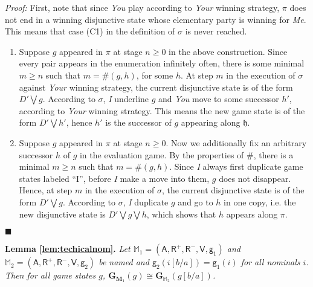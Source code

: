 \documentclass{easychair}
\newcommand{\I}{\emph{I}\xspace}
\newcommand{\You}{\emph{You}\xspace}
\newcommand{\Me}{\emph{Me}\xspace}
\newcommand{\Your}{\emph{Your}\xspace}
\newcommand{\A}{\mathsf{A}}
\newcommand{\R}{\mathsf{R}}
\newcommand{\V}{\mathsf{V}}
\newcommand{\g}{\mathsf{g}}
\renewcommand{\qed}{\hfill$\blacksquare$}
\renewenvironment{proof}{\noindent\textit{Proof:}\quad}{\qed}
\begin{document}
\begin{proof}
First, note that since \You play according to \Your winning strategy,
$\pi$ does not end in a winning disjunctive state whose elementary party is winning for \Me. This means that case (C1) in the definition of $\sigma$ is never reached.


\begin{enumerate}
    \item Suppose $g$ appeared in $\pi$ at stage $n\geq 0$ in the above construction. Since every pair appears in the enumeration infinitely often, there is some minimal $m \geq n$ such that $m=\#(g,h)$, for some $h$. At step $m$ in the execution of $\sigma$ against \Your winning strategy, the current disjunctive state is of the form $D'\bigvee g$. According to $\sigma$, \I underline $g$ and \You move to some successor $h'$, according to \Your winning strategy. This means the new game state is of the form $D' \bigvee h'$, hence $h'$ is the successor of $g$ appearing along $\mathfrak{h}$.
    \item Suppose $g$ appeared in $\pi$ at stage $n\geq 0$. Now we additionally fix an arbitrary successor $h$ of $g$ in the evaluation game. By the properties of $\#$, there is a minimal $m\geq n$ such that $m=\#(g,h)$. Since \I always first duplicate game states labeled ``I'', before \I make a move into them, $g$ does not disappear. Hence, at step $m$ in the execution of $\sigma$, the current disjunctive state is of the form $D'\bigvee g$. According to $\sigma$, \I duplicate $g$ and go to $h$ in one copy, i.e. the new disjunctive state is $D'\bigvee g \bigvee h$, which shows that $h$ appears along $\pi$. 
\end{enumerate} 
\end{proof}

\noindent
{\bf Lemma \ref{lem:techicalnom}.}
\textit{Let $\mathbb{M}_1=(\A,\R^+,\R^-,\V,\g_1)$ and $\mathbb{M}_2=(\A,\R^+,\R^-,\V,\g_2)$ be named and $\g_2(i[b/a])=\g_1(i)$ for all nominals $i$. Then for all game states $g$, $\mathbf{G}_{\mathbf{M}_1}(g)\cong \mathbf{G}_{\mathbb{M}_2}(g[b/a])$.
}
\end{document}
